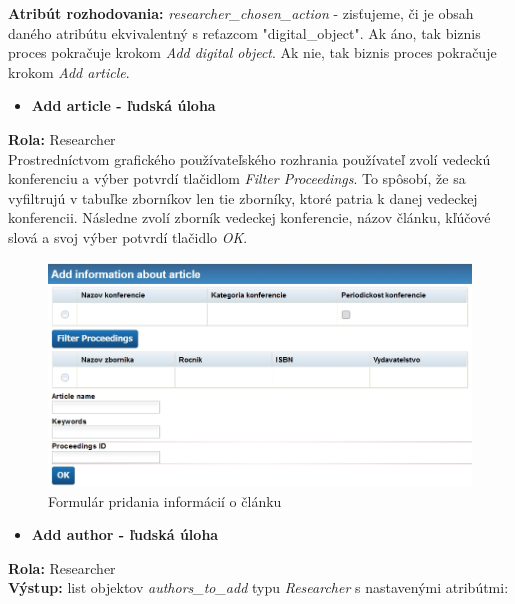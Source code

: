 \documentclass[10pt,oneside,slovak,a4paper]{article}
\begin{document}
\textbf{Atribút rozhodovania:} \textit{researcher\_chosen\_action} - zisťujeme, či je obsah daného atribútu ekvivalentný s reťazcom "digital\_object". Ak áno, tak biznis proces pokračuje krokom \textit{Add digital object}. Ak nie, tak biznis proces pokračuje krokom \textit{Add article}.

\begin{itemize}
\item \textbf{Add article - ľudská úloha}
\end{itemize}

\textbf{Rola:} Researcher\\

Prostredníctvom grafického používateľského rozhrania používateľ zvolí vedeckú konferenciu a výber potvrdí tlačidlom \textit{Filter Proceedings}. To spôsobí, že sa vyfiltrujú v tabuľke zborníkov len tie zborníky, ktoré patria k danej vedeckej konferencii. Následne zvolí zborník vedeckej konferencie, názov článku, kľúčové slová a svoj výber potvrdí tlačidlo \textit{OK}.

\begin{figure} [H]
\centering
\includegraphics[scale=0.4]{forms/formAddInformation.jpg} 
\caption{Formulár pridania informácií o článku}
\end{figure}

\begin{itemize}
\item \textbf{Add author - ľudská úloha}
\end{itemize}

\textbf{Rola:} Researcher\\
\textbf{Výstup:} list objektov \textit{authors\_to\_add} typu \textit{Researcher} s nastavenými atribútmi:
\end{document}
